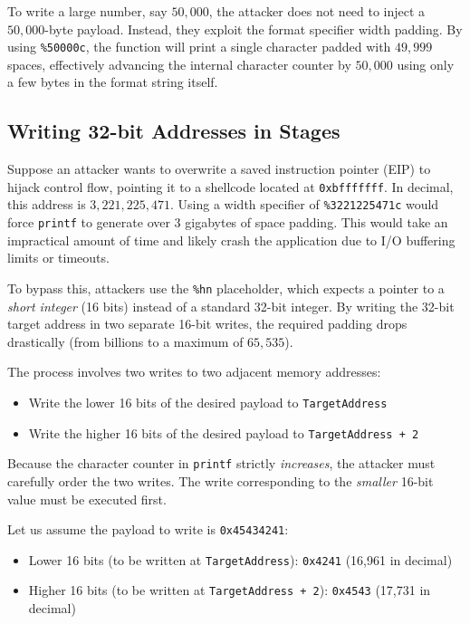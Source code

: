 To write a large number, say $50,000$, the attacker does not need to inject a $50,000$-byte payload. Instead, they exploit the format specifier width padding. By using \texttt{\%50000c}, the function will print a single character padded with $49,999$ spaces, effectively advancing the internal character counter by $50,000$ using only a few bytes in the format string itself.

\subsection{Writing 32-bit Addresses in Stages}
Suppose an attacker wants to overwrite a saved instruction pointer (EIP) to hijack control flow, pointing it to a shellcode located at \texttt{0xbfffffff}. In decimal, this address is $3,221,225,471$. Using a width specifier of \texttt{\%3221225471c} would force \texttt{printf} to generate over 3 gigabytes of space padding. This would take an impractical amount of time and likely crash the application due to I/O buffering limits or timeouts.

To bypass this, attackers use the \texttt{\%hn} placeholder, which expects a pointer to a \emph{short integer} (16 bits) instead of a standard 32-bit integer. By writing the 32-bit target address in two separate 16-bit writes, the required padding drops drastically (from billions to a maximum of $65,535$).

The process involves two writes to two adjacent memory addresses:
\begin{itemize}
    \item Write the lower 16 bits of the desired payload to \texttt{TargetAddress}
    \item Write the higher 16 bits of the desired payload to \texttt{TargetAddress + 2}
\end{itemize}

Because the character counter in \texttt{printf} strictly \emph{increases}, the attacker must carefully order the two writes. The write corresponding to the \emph{smaller} 16-bit value must be executed first.

Let us assume the payload to write is \texttt{0x45434241}:
\begin{itemize}
    \item Lower 16 bits (to be written at \texttt{TargetAddress}): \texttt{0x4241} (16,961 in decimal)
    \item Higher 16 bits (to be written at \texttt{TargetAddress + 2}): \texttt{0x4543} (17,731 in decimal)
\end{itemize}

